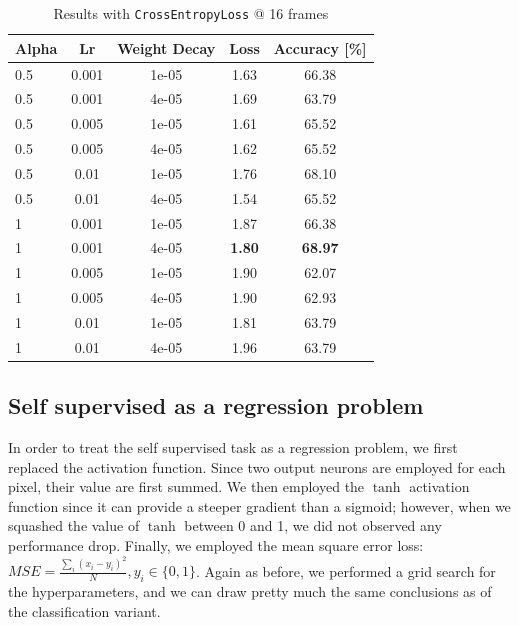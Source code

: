 \documentclass[10pt,twocolumn,letterpaper]{article}
\begin{document}
\begin{table}[h!]
	\begin{center}
		\begin{tabular}{lcc|cc}
			\textbf{Alpha} & \textbf{Lr} & \textbf{Weight Decay} & \textbf{Loss} & \textbf{Accuracy [\%]}\\
			\hline
			0.5&0.001&1e-05&1.63&66.38\\
			0.5&0.001&4e-05&1.69&63.79\\
			0.5&0.005&1e-05&1.61&65.52\\
			0.5&0.005&4e-05&1.62&65.52\\
			0.5&0.01&1e-05&1.76&68.10\\
			0.5&0.01&4e-05&1.54&65.52\\
			1&0.001&1e-05&1.87&66.38\\
			1&0.001&4e-05&\textbf{1.80}&\textbf{68.97}\\
			1&0.005&1e-05&1.90&62.07\\
			1&0.005&4e-05&1.90&62.93\\
			1&0.01&1e-05&1.81&63.79\\
			1&0.01&4e-05&1.96&63.79\\
			\hline
		\end{tabular}
	\end{center}	
	\caption{Results with \texttt{CrossEntropyLoss} @ 16 frames}
	\label{tab:ms_tb2}
	\vspace*{0pt}
\end{table}

\subsection{Self supervised as a regression problem}

In order to treat the self supervised task as a regression problem, we first replaced the activation function. Since two output neurons are employed for each pixel, their value are first summed. We then employed the $\tanh$ activation function since it can provide a steeper gradient than a sigmoid; however, when we squashed the value of $\tanh$ between 0 and 1, we did not observed any performance drop. Finally, we employed the mean square error loss: $ MSE = \frac{\sum_i (x_i - y_i)^2}{N}, y_i \in \{0, 1\}$. Again as before, we performed a grid search for the hyperparameters, and we can draw pretty much the same conclusions as of the classification variant.
\end{document}
